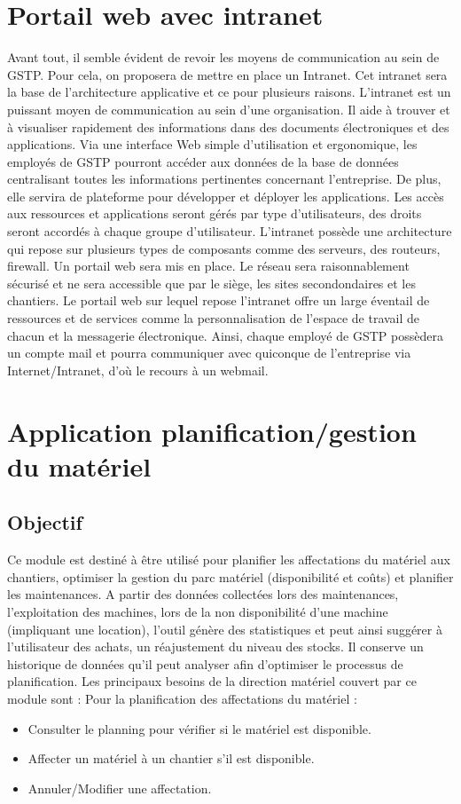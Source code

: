 \section{Portail web avec intranet}
	Avant tout, il semble évident de revoir les moyens de communication au sein de GSTP. Pour cela, on proposera de mettre en place un Intranet. Cet intranet sera la base de l'architecture applicative et ce pour plusieurs raisons. L'intranet est un puissant moyen de communication au sein d'une organisation. Il aide à trouver et à visualiser rapidement des informations dans des documents électroniques et des applications. Via une interface Web simple d'utilisation et ergonomique, les employés de GSTP pourront accéder aux données de la base de données centralisant toutes les informations pertinentes concernant l'entreprise. De plus, elle servira de plateforme pour développer et déployer les applications. Les accès aux ressources et applications seront gérés par type d'utilisateurs, des droits seront accordés à chaque groupe d'utilisateur. L'intranet possède une architecture qui repose sur plusieurs types de composants comme des serveurs, des routeurs, firewall.
	Un portail web sera mis en place. Le réseau sera raisonnablement sécurisé et ne sera accessible que par le siège, les sites secondondaires et les chantiers. Le portail web sur lequel repose l'intranet offre un large éventail de ressources et de services comme la personnalisation de l'espace de travail de chacun et la messagerie électronique. Ainsi, chaque employé de GSTP possèdera un compte mail et pourra communiquer avec quiconque de l'entreprise via Internet/Intranet, d'où le recours à un webmail.

\section{Application planification/gestion du matériel}
	\subsection{Objectif}
	Ce module est destiné à être utilisé pour planifier les affectations du matériel aux chantiers, optimiser la gestion du parc matériel (disponibilité et coûts) et planifier les maintenances.
	A partir des données collectées lors des maintenances, l'exploitation des machines, lors de la non disponibilité d'une machine (impliquant une location), l'outil génère des statistiques et peut ainsi suggérer à l'utilisateur des achats, un réajustement du niveau des stocks.
	Il conserve un historique de données qu'il peut analyser afin d'optimiser le processus de planification. Les principaux besoins de la direction matériel couvert par ce module sont :
        Pour la planification des affectations du matériel :
               \begin{itemize}
	               \item Consulter le planning pour vérifier si le matériel est disponible.
	               \item Affecter un matériel à un chantier s'il est disponible.
	               \item Annuler/Modifier une affectation.
               \end{itemize}

